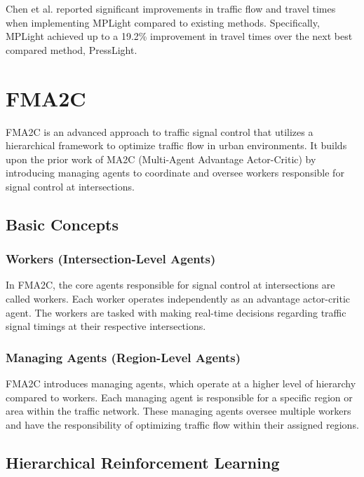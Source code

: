 Chen et al.\cite{chen2020toward} reported significant improvements in traffic flow and travel times when implementing MPLight compared to existing methods. Specifically, MPLight achieved up to a 19.2\% improvement in travel times over the next best compared method, PressLight.

\section{FMA2C}\label{sec:FMA2C}

FMA2C\cite{chu2019multi} is an advanced approach to traffic signal control that utilizes a hierarchical framework to optimize traffic flow in urban environments. It builds upon the prior work of MA2C (Multi-Agent Advantage Actor-Critic) by introducing managing agents to coordinate and oversee workers responsible for signal control at intersections.

\subsection{Basic Concepts}

\subsubsection{Workers (Intersection-Level Agents)}

In FMA2C, the core agents responsible for signal control at intersections are called workers. Each worker operates independently as an advantage actor-critic agent. The workers are tasked with making real-time decisions regarding traffic signal timings at their respective intersections.

\subsubsection{Managing Agents (Region-Level Agents)}

FMA2C introduces managing agents, which operate at a higher level of hierarchy compared to workers. Each managing agent is responsible for a specific region or area within the traffic network. These managing agents oversee multiple workers and have the responsibility of optimizing traffic flow within their assigned regions.

\subsection{Hierarchical Reinforcement Learning}

